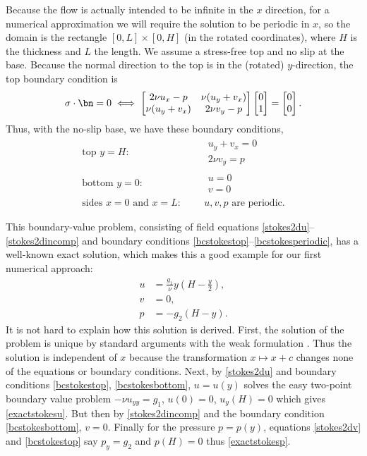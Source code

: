 Because the flow is actually intended to be infinite in the $x$ direction, for a numerical approximation we will require the solution to be periodic in $x$, so the domain is the rectangle $[0,L]\times[0,H]$ (in the rotated coordinates), where $H$ is the thickness and $L$ the length.  We assume a stress-free top and no slip at the base.  Because the normal direction to the top is in the (rotated) $y$-direction, the top boundary condition is
  $$\sigma\cdot\bn = 0 \iff
\begin{bmatrix}
2 \nu u_x - p & \nu (u_y+v_x) \\
\nu (u_y+v_x) & 2 \nu v_y - p
\end{bmatrix} \begin{bmatrix}
0 \\ 1
\end{bmatrix} = \begin{bmatrix}
0 \\ 0
\end{bmatrix}.$$
Thus, with the no-slip base, we have these boundary conditions,
\begin{align}
\text{top $y=H$:}&    & &\begin{array}{l} u_y + v_x = 0 \\ 2 \nu v_y = p\end{array}  \label{bcstokestop} \\
\text{bottom $y=0$:}& & &\begin{array}{l} u = 0 \\ v = 0 \end{array} \label{bcstokesbottom} \\
\text{sides $x=0$ and $x=L$:}&
                      & &u,v,p \text{ are periodic}. \label{bcstokesperiodic}
\end{align}

This boundary-value problem, consisting of field equations \eqref{stokes2du}--\eqref{stokes2dincomp} and boundary conditions \eqref{bcstokestop}--\eqref{bcstokesperiodic}, has a well-known exact solution, which makes this a good example for our first numerical approach:
\begin{align}
u &= \frac{g_1}{\nu} y \left(H - \frac{y}{2}\right), \label{exactstokesu} \\
v &= 0, \label{exactstokesv} \\
p &= -g_2 (H-y).\label{exactstokesp}
\end{align}
It is not hard to explain how this solution is derived.  First, the solution of the problem is unique by standard arguments with the weak formulation \citep[p.~223]{Elmanetal2005}.  Thus the solution is independent of $x$ because the transformation $x\mapsto x+c$ changes none of the equations or boundary conditions.  Next, by \eqref{stokes2du} and boundary conditions \eqref{bcstokestop}, \eqref{bcstokesbottom}, $u=u(y)$ solves the easy two-point boundary value problem $-\nu u_{yy} = g_1$, $u(0)=0$, $u_y(H)=0$ which gives \eqref{exactstokesu}.  But then by \eqref{stokes2dincomp} and the boundary condition \eqref{bcstokesbottom}, $v=0$.  Finally for the pressure $p=p(y)$, equations \eqref{stokes2dv} and \eqref{bcstokestop} say $p_y=g_2$ and $p(H)=0$ thus \eqref{exactstokesp}.


